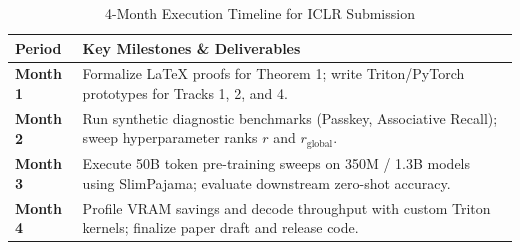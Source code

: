 \documentclass[11pt,a4paper]{article}
\begin{document}
\begin{table}[h]
\centering
\caption{4-Month Execution Timeline for ICLR Submission}
\vspace{2mm}
\begin{tabular}{lp{11cm}}
\toprule
\textbf{Period} & \textbf{Key Milestones \& Deliverables} \\
\midrule
\textbf{Month 1} & Formalize LaTeX proofs for Theorem 1; write Triton/PyTorch prototypes for Tracks 1, 2, and 4. \\
\textbf{Month 2} & Run synthetic diagnostic benchmarks (Passkey, Associative Recall); sweep hyperparameter ranks $r$ and $r_{\text{global}}$. \\
\textbf{Month 3} & Execute 50B token pre-training sweeps on 350M / 1.3B models using SlimPajama; evaluate downstream zero-shot accuracy. \\
\textbf{Month 4} & Profile VRAM savings and decode throughput with custom Triton kernels; finalize paper draft and release code. \\
\bottomrule
\end{tabular}
\end{table}
\end{document}
